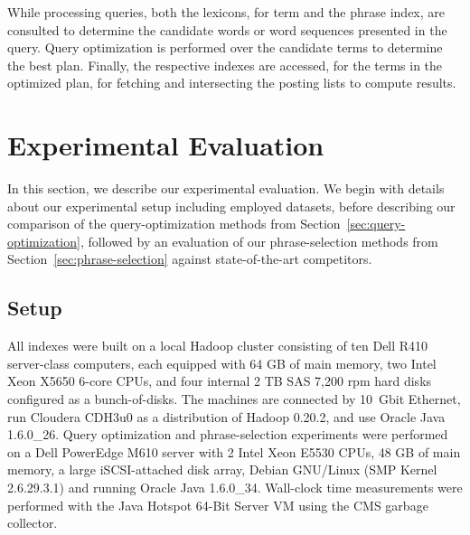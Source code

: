 While processing queries, both the lexicons, for term and the phrase index, are consulted to determine the candidate words or word sequences presented in the query. Query optimization is performed over the candidate terms to determine the best plan. Finally, the respective indexes are accessed, for the terms in the optimized plan, for fetching and intersecting the posting lists to compute results.

\section{Experimental Evaluation}
\label{sec:exper-eval}

In this section, we describe our experimental evaluation. We begin
with details about our experimental setup including employed datasets,
before describing our comparison of the query-optimization methods
from Section~\ref{sec:query-optimization}, followed by an evaluation
of our phrase-selection methods from
Section~\ref{sec:phrase-selection} against state-of-the-art
competitors.

\subsection{Setup}
All indexes were built on a local Hadoop cluster
consisting of ten Dell R410 server-class computers, each equipped with
64 GB of main memory, two Intel Xeon X5650 6-core CPUs, and four
internal 2 TB SAS 7,200 rpm hard disks configured as a
bunch-of-disks. The machines are connected by 10~Gbit Ethernet, run
Cloudera CDH3u0 as a distribution of Hadoop 0.20.2, and use Oracle
Java 1.6.0\_26. Query optimization and phrase-selection experiments
were performed on a Dell PowerEdge M610 server with 2 Intel Xeon E5530
CPUs, 48 GB of main memory, a large iSCSI-attached disk array, Debian
GNU/Linux (SMP Kernel 2.6.29.3.1) and running Oracle Java
1.6.0\_34. Wall-clock time measurements were performed with the Java
Hotspot 64-Bit Server VM using the CMS garbage collector.


